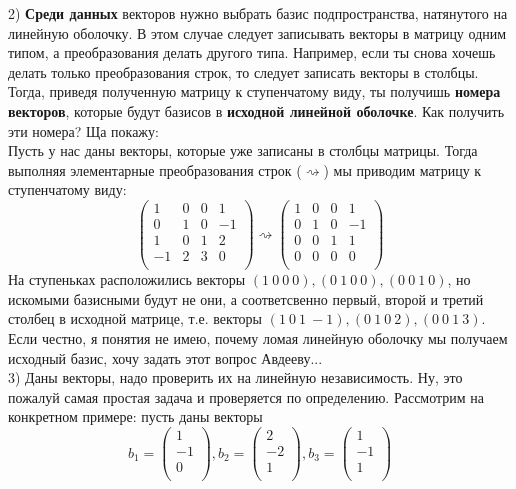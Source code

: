 \documentclass[a4paper,11pt]{report}
\begin{document}
2) \textbf{Среди данных} векторов нужно {выбрать} базис подпространства, натянутого на линейную оболочку. В этом
случае следует записывать векторы в матрицу одним типом, а преобразования делать другого типа. Например, если ты снова хочешь
делать только преобразования строк, то следует записать векторы в столбцы. Тогда, приведя полученную матрицу к ступенчатому
виду, ты получишь \textbf{номера векторов}, которые будут базисов в \textbf{исходной линейной оболочке}. Как получить эти номера?
Ща покажу:\\
Пусть у нас даны векторы, которые уже записаны в столбцы матрицы. Тогда выполняя элементарные преобразования строк
($\rightsquigarrow$) мы приводим матрицу к ступенчатому виду:
\[
\begin{pmatrix}
1 & 0 & 0 & 1\\
0 & 1 & 0 & -1\\
1 & 0 & 1 & 2\\
-1 & 2 & 3 & 0\\
\end{pmatrix}
\rightsquigarrow
\begin{pmatrix}
1 & 0 & 0 & 1\\
0 & 1 & 0 & -1\\
0 & 0 & 1 & 1\\
0 & 0 & 0 & 0\\
\end{pmatrix}
\]
На ступеньках расположились векторы $(1\ 0\ 0\ 0), (0\ 1\ 0\ 0), (0\ 0\ 1\ 0)$, но искомыми базисными будут не они,
а соответсвенно первый, второй и третий столбец в исходной матрице, т.е. векторы $(1\ 0\ 1\ -1), (0\ 1\ 0\ 2), (0\ 0\ 1\ 3)$.\\
Если честно, я понятия не имею, почему ломая линейную оболочку мы получаем исходный базис, хочу задать этот вопрос
Авдееву...\\
3) Даны векторы, надо проверить их на линейную независимость. Ну, это пожалуй самая простая задача и проверяется по определению.
Рассмотрим на конкретном примере: пусть даны векторы
\[
b_1 = 
\begin{pmatrix}
1\\
-1\\
0\\
\end{pmatrix},
b_2 = 
\begin{pmatrix}
2\\
-2\\
1\\
\end{pmatrix},
b_3 = 
\begin{pmatrix}
1\\
-1\\
1\\
\end{pmatrix}
\]
\end{document}
